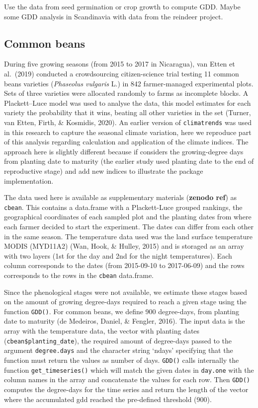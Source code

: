 \documentclass[
]{article}
\begin{document}
Use the data from seed germination or crop growth to compute GDD. Maybe
some GDD analysis in Scandinavia with data from the reindeer project.

\hypertarget{common-beans}{%
\subsection{Common beans}\label{common-beans}}

During five growing seasons (from 2015 to 2017 in Nicaragua), van Etten
et al.~(2019) conducted a crowdsourcing citizen-science trial testing 11
common beans varieties (\emph{Phaseolus vulgaris} L.) in 842
farmer-managed experimental plots. Sets of three varieties were
allocated randomly to farms as incomplete blocks. A Plackett--Luce model
was used to analyse the data, this model estimates for each variety the
probability that it wins, beating all other varieties in the set
(Turner, van Etten, Firth, \& Kosmidis, 2020). An earlier version of
\texttt{climatrends} was used in this research to capture the seasonal
climate variation, here we reproduce part of this analysis regarding
calculation and application of the climate indices. The approach here is
slightly different because if considers the growing-degree days from
planting date to maturity (the earlier study used planting date to the
end of reproductive stage) and add new indices to illustrate the package
implementation.

The data used here is available as supplementary materials
(\textbf{zenodo ref}) as \texttt{cbean}. This contains a data.frame with
a Plackett-Luce grouped rankings, the geographical coordinates of each
sampled plot and the planting dates from where each farmer decided to
start the experiment. The dates can differ from each other in the same
season. The temperature data used was the land surface temperature MODIS
(MYD11A2) (Wan, Hook, \& Hulley, 2015) and is storaged as an array with
two layers (1st for the day and 2nd for the night temperatures). Each
column corresponds to the dates (from 2015-09-10 to 2017-06-09) and the
rows corresponds to the rows in the \texttt{cbean} data.frame.

Since the phenological stages were not available, we estimate these
stages based on the amount of growing degree-days required to reach a
given stage using the function \texttt{GDD()}. For common beans, we
define 900 degree-days, from planting date to maturity (de Medeiros,
Daniel, \& Fengler, 2016). The input data is the array with the
temperature data, the vector with planting dates
(\texttt{cbean\$planting\_date}), the required amount of degree-days
passed to the argument \texttt{degree.days} and the character string
`ndays' specifying that the function must return the values as number of
days. \texttt{GDD()} calls internally the function
\texttt{get\_timeseries()} which will match the given dates in
\texttt{day.one} with the column names in the array and concatenate the
values for each row. Then \texttt{GDD()} computes the degree-days for
the time series and return the length of the vector where the
accumulated gdd reached the pre-defined threshold (900).
\end{document}
